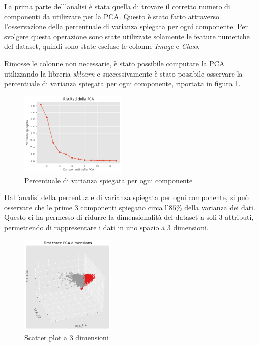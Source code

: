 La prima parte dell'analisi è stata quella di trovare il corretto numero di
componenti da utilizzare per la PCA. Questo è stato fatto attraverso
l'osservazione della percentuale di varianza spiegata per ogni componente. Per
svolgere questa operazione sono state utilizzate solamente le feature numeriche
del dataset, quindi sono state escluse le colonne \textit{Image} e \textit{Class}.

Rimosse le colonne non necessarie, è stato possibile computare la PCA utilizzando
la libreria \textit{sklearn} e successivamente è stato possibile osservare la
percentuale di varianza spiegata per ogni componente, riportata in figura \ref{fig:pca}.
\begin{figure}[!ht]
      \centering
      \includegraphics[width=0.45\textwidth]{img/analisi/pcaVarianza.png}
      \caption{Percentuale di varianza spiegata per ogni componente}
      \label{fig:pca}
\end{figure}

Dall'analisi della percentuale di varianza spiegata per ogni componente, si può
osservare che le prime $3$ componenti spiegano circa l'$85\%$ della varianza
dei dati. Questo ci ha permesso di ridurre la dimensionalità del dataset a soli
$3$ attributi, permettendo di rappresentare i dati in uno spazio a $3$ dimensioni.
\begin{figure}[!ht]
      \centering
      \includegraphics[width=0.4\textwidth]{img/analisi/pcaNuovoDataset.png}
      \caption{Scatter plot a 3 dimensioni}
      \label{fig:pca-3d}
\end{figure}

